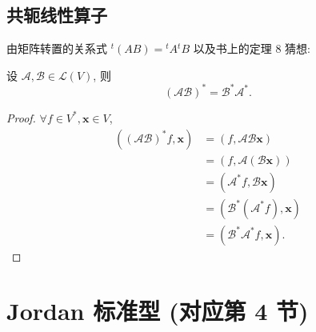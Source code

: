 \documentclass[color=black,device=normal,lang=cn,mode=geye]{elegantnote}
\begin{document}
\subsection{共轭线性算子}
由矩阵转置的关系式 ${}^t(AB)={}^tA{}^tB$ 以及书上的定理 8 猜想:
\begin{theorem}
    设 $\mathcal{A},\mathcal{B}\in\mathcal{L}(V)$, 则
    \[(\mathcal{AB})^*=\mathcal{B}^*\mathcal{A}^*.\]
\end{theorem}
\begin{proof}
    $\forall f\in V^*,\boldsymbol{x}\in V$,
    \begin{align*}
        ((\mathcal{AB})^*f,\boldsymbol{x}) & =(f,\mathcal{AB}\boldsymbol{x}) \\
        & =(f,\mathcal{A}(\mathcal{B}\boldsymbol{x})) \\
        & =(\mathcal{A}^*f,\mathcal{B}\boldsymbol{x}) \\
        & =(\mathcal{B}^*(\mathcal{A}^*f),\boldsymbol{x}) \\
        & =(\mathcal{B}^*\mathcal{A}^*f,\boldsymbol{x}).
    \end{align*}
\end{proof}
\section{Jordan 标准型 (对应第 4 节)}
\end{document}
